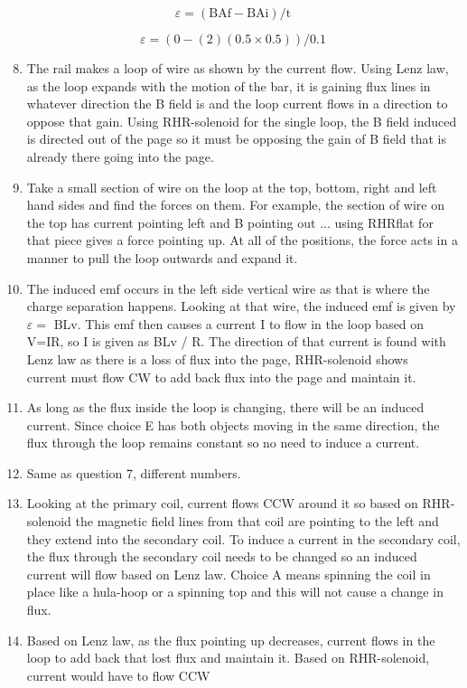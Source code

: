 \begin{enumerate}
$$
\varepsilon=(\mathrm{BAf}-\mathrm{BAi}) / \mathrm{t}
$$

$$
\varepsilon=(0-(2)(0.5 \times 0.5)) / 0.1
$$

\begin{enumerate}
  \setcounter{enumi}{7}
  \item The rail makes a loop of wire as shown by the current flow. Using Lenz law, as the loop expands with the motion of the bar, it is gaining flux lines in whatever direction the B field is and the loop current flows in a direction to oppose that gain. Using RHR-solenoid for the single loop, the B field induced is directed out of the page so it must be opposing the gain of B field that is already there going into the page.
  \item Take a small section of wire on the loop at the top, bottom, right and left hand sides and find the forces on them. For example, the section of wire on the top has current pointing left and B pointing out ... using RHRflat for that piece gives a force pointing up. At all of the positions, the force acts in a manner to pull the loop outwards and expand it.
  \item The induced emf occurs in the left side vertical wire as that is where the charge separation happens. Looking at that wire, the induced emf is given by $\varepsilon=$ BLv. This emf then causes a current I to flow in the loop based on V=IR, so I is given as BLv / R. The direction of that current is found with Lenz law as there is a loss of flux into the page, RHR-solenoid shows\\
current must flow CW to add back flux into the page and maintain it.
  \item As long as the flux inside the loop is changing, there will be an induced current. Since choice E has both objects moving in the same direction, the flux through the loop remains constant so no need to induce a current.
  \item Same as question 7, different numbers.
  \item Looking at the primary coil, current flows CCW around it so based on RHR-solenoid the magnetic field lines from that coil are pointing to the left and they extend into the secondary coil. To induce a current in the secondary coil, the flux through the secondary coil needs to be changed so an induced current will flow based on Lenz law. Choice A means spinning the coil in place like a hula-hoop or a spinning top and this will not cause a change in flux.
  \item Based on Lenz law, as the flux pointing up decreases, current flows in the loop to add back that lost flux and maintain it. Based on RHR-solenoid, current would have to flow CCW

\end{enumerate}
\end{enumerate}
